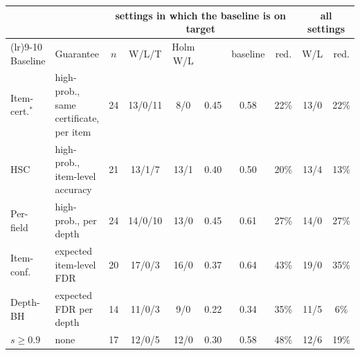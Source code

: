 \begin{tabularx}{\textwidth}{>{\raggedright\arraybackslash}p{1.45cm} >{\raggedright\arraybackslash}X cccccccc}
\toprule
 & & \multicolumn{6}{c}{settings in which the baseline is on target} & \multicolumn{2}{c}{all settings} \\
\cmidrule(lr){3-8}\cmidrule(lr){9-10}
Baseline & Guarantee & $n$ & W/L/T & Holm W/L & \hlcl{} & baseline & red. & W/L & red. \\
\midrule
Item-cert.$^\ast$ & high-prob., same certificate, per item & 24 & 13/0/11 & 8/0 & 0.45 & 0.58 & 22\% & 13/0 & 22\% \\
HSC & high-prob., item-level accuracy & 21 & 13/1/7 & 13/1 & 0.40 & 0.50 & 20\% & 13/4 & 13\% \\
Per-field & high-prob., per depth & 24 & 14/0/10 & 13/0 & 0.45 & 0.61 & 27\% & 14/0 & 27\% \\
\midrule
Item-conf. & expected item-level FDR & 20 & 17/0/3 & 16/0 & 0.37 & 0.64 & 43\% & 19/0 & 35\% \\
Depth-BH & expected FDR per depth & 14 & 11/0/3 & 9/0 & 0.22 & 0.34 & 35\% & 11/5 & 6\% \\
$s\ge0.9$ & none & 17 & 12/0/5 & 12/0 & 0.30 & 0.58 & 48\% & 12/6 & 19\% \\
\bottomrule
\end{tabularx}

